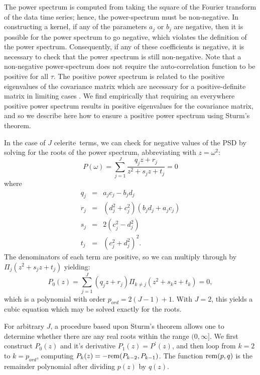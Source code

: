 \documentclass[manuscript, letterpaper]{aastex6}
\newcommand{\project}[1]{\textsf{#1}}
\newcommand{\celerite}{\project{celerite}}
\begin{document}
The power spectrum is computed from taking the square of the Fourier transform
of the data time series; hence, the power-spectrum must be non-negative.  In
constructing a kernel, if any of the parameters $a_j$ or $b_j$ are negative,
then it is possible for the power spectrum to go negative, which violates the
definition of the power spectrum.
Consequently, if any of these coefficients is negative, it is necessary to
check that the power spectrum is still non-negative.  Note that a non-negative
power-spectrum does not require the auto-correlation
function to be positive for all $\tau$.  The positive power spectrum is
related to the positive eigenvalues of the covariance matrix which are
necessary for a positive-definite matrix in limiting cases
\citep{Messerschmitt:2006}.  We find empirically that requiring an everywhere
positive power spectrum results in positive eigenvalues for the covariance
matrix, and so we describe here how to ensure a positive power spectrum using
Sturm's theorem.

In the case of $J$ \celerite\ terms, we can check for negative values of the
PSD by solving for the roots of the power spectrum, abbreviating with
$z = \omega^2$:
\begin{equation}
P(\omega)=  \sum_{j=1}^J \frac{q_j z + r_j}{z^2+s_jz + t_j} = 0
\end{equation}
where
\begin{eqnarray}
q_j &=& a_jc_j-b_jd_j\\
r_j &=& (d_j^2+c_j^2)(b_jd_j+a_jc_j)\\
s_j &=& 2(c_j^2-d_j^2)\\
t_j &=& (c_j^2+d_j^2)^2.
\end{eqnarray}
The denominators of each term are positive, so we can multiply through by $\Pi_j \left(z^2+s_jz + t_j\right)$ yielding:
\begin{equation}
P_0(z) = \sum_{j=1}^J (q_j z + r_j)\Pi_{k \ne j}\left(z^2+s_kz + t_k\right) = 0,
\end{equation}
which is a polynomial with order $p_{ord}=2(J-1)+1$.  With $J=2$, this yields a cubic equation
which may be solved exactly for the roots.

For arbitrary $J$, a procedure based upon Sturm's theorem \citep{Dorrie:1965} allows one to determine whether there are any
real roots within the range $(0,\infty]$. We first construct $P_0(z)$ and it's derivative
$P_1(z) = P^\prime(z)$, and then loop from $k=2$ to $k=p_{ord}$, computing
$P_k(z) = -{\rm rem}(P_{k-2},P_{k-1})$.  The function ${\rm rem}(p,q)$ is the remainder polynomial after dividing $p(z)$ by $q(z)$.
\end{document}
